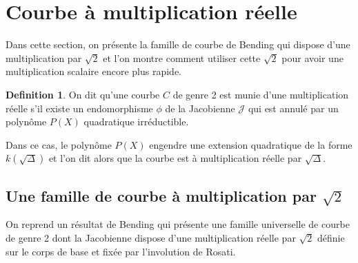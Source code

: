 \documentclass[a4paper,12pt]{article}
\theoremstyle{definition}
\newtheorem{definition}{Definition}[section]
\theoremstyle{remark}
\numberwithin{equation}{section}
\begin{document}
\section{Courbe à multiplication réelle}

Dans cette section, on présente la famille de courbe de Bending qui dispose d'une multiplication par $\sqrt{2}$ et l'on montre comment utiliser cette $\sqrt{2}$ pour avoir une multiplication scalaire encore plus rapide.

\begin{definition}
On dit qu'une courbe $C$ de genre 2 est munie d'une multiplication réelle s'il existe un endomorphisme $\phi$ de la Jacobienne $\mathcal{J}$ qui est annulé par un polynôme $P(X)$ quadratique irréductible.

Dans ce cas, le polynôme $P(X)$ engendre une extension quadratique de la forme $k(\sqrt\Delta)$ et l'on dit alors que la courbe est à multiplication réelle par $\sqrt\Delta$.
\end{definition}

\subsection{Une famille de courbe à multiplication par \texorpdfstring{$\sqrt{2}$}{sqrt2}}

On reprend un résultat de Bending qui présente une famille universelle de courbe de genre 2 dont la Jacobienne dispose d'une multiplication réelle par $\sqrt2$ définie sur le corps de base et fixée par l'involution de Rosati.
\end{document}
